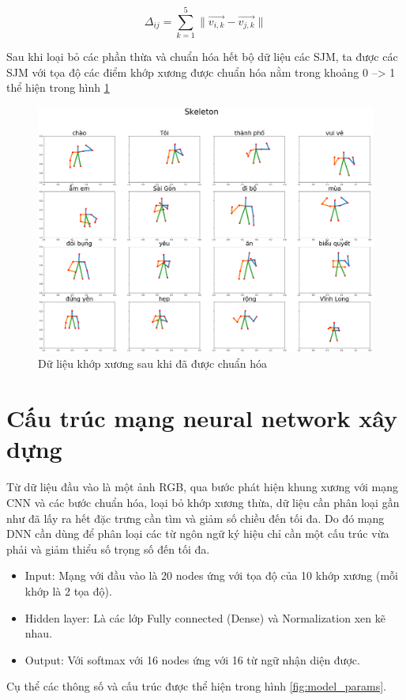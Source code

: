 \begin{equation}
{\Delta _{ij}} = \sum\limits_{k = 1}^5 {\parallel \overrightarrow {{v_{i,k}}}  - \overrightarrow {{v_{j,k}}} \parallel } 
\label{equ3.8}
\end{equation}




Sau khi loại bỏ các phần thừa và chuẩn hóa hết bộ dữ liệu các SJM, ta được các SJM với tọa độ các điểm khớp xương được chuẩn hóa nằm trong khoảng 0 --> 1 thể hiện trong hình \ref{fig:skeleton_normalize}
\FloatBarrier
\begin{figure}[htp]
\begin{center}
\includegraphics[scale=0.25]{chap4/c4_figs/datajoint.png}
\end{center}
\caption{Dữ liệu khớp xương sau khi đã được chuẩn hóa}
\label{fig:skeleton_normalize}
\end{figure}
\FloatBarrier

\section{Cấu trúc mạng neural network xây dựng}
Từ dữ liệu đầu vào là một ảnh RGB, qua bước phát hiện khung xương với mạng CNN và các bước chuẩn hóa, loại bỏ khớp xương thừa, dữ liệu cần phân loại gần như đã lấy ra hết đặc trưng cần tìm và giảm số chiều đến tối đa. Do đó mạng DNN cần dùng để phân loại các từ ngôn ngữ ký hiệu chỉ cần một cấu trúc vừa phải và giảm thiểu số trọng số đến tối đa.
\begin{itemize}
\item Input: Mạng với đầu vào là 20 nodes ứng với tọa độ của 10 khớp xương (mỗi khớp là 2 tọa độ).
\item Hidden layer: Là các lớp Fully connected (Dense) và Normalization xen kẽ nhau.
\item Output: Với softmax với 16 nodes ứng với 16 từ ngữ nhận diện được.
\end{itemize}
Cụ thể các thông số và cấu trúc được thể hiện trong hình \ref{fig:model_params}.

